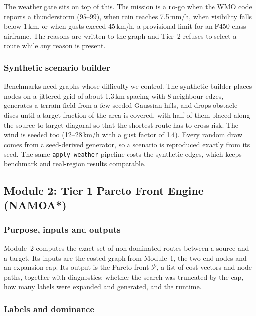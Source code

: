 \documentclass{ssnreview}
\begin{document}
The weather gate sits on top of this. The mission is a no-go when the WMO code reports a
thunderstorm (95--99), when rain reaches 7.5\,mm/h, when visibility falls below 1\,km, or
when gusts exceed 45\,km/h, a provisional limit for an F450-class airframe. The reasons
are written to the graph and Tier~2 refuses to select a route while any reason is present.

\subsubsection{Synthetic scenario builder}

Benchmarks need graphs whose difficulty we control. The synthetic builder places nodes on
a jittered grid of about 1.3\,km spacing with 8-neighbour edges, generates a terrain field
from a few seeded Gaussian hills, and drops obstacle discs until a target fraction of the
area is covered, with half of them placed along the source-to-target diagonal so that the
shortest route has to cross risk. The wind is seeded too (12--28\,km/h with a gust factor
of 1.4). Every random draw comes from a seed-derived generator, so a scenario is
reproduced exactly from its seed. The same \texttt{apply\_weather} pipeline costs the
synthetic edges, which keeps benchmark and real-region results comparable.

\subsection{Module 2: Tier 1 Pareto Front Engine (NAMOA*)}\label{sec:m2}

\subsubsection{Purpose, inputs and outputs}

Module~2 computes the exact set of non-dominated routes between a source and a target.
Its inputs are the costed graph from Module~1, the two end nodes and an expansion cap. Its
output is the Pareto front $\mathcal{P}$, a list of cost vectors and node paths, together
with diagnostics: whether the search was truncated by the cap, how many labels were
expanded and generated, and the runtime.

\subsubsection{Labels and dominance}
\end{document}
